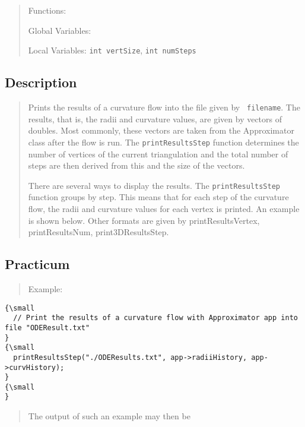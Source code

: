 \begin{quotation}
Functions:

Global Variables:

Local Variables: \texttt{int vertSize}, \texttt{int numSteps}
\end{quotation}

\subsection*{Description}

\begin{quotation}
Prints the results of a curvature flow into the file given by \texttt{%
filename}. The results, that is, the radii and curvature values, are given
by vectors of doubles. Most commonly, these vectors are taken from the
Approximator class after the flow is run. The \texttt{printResultsStep}
function determines the number of vertices of the current triangulation and
the total number of steps are then derived from this and the size of the
vectors.

There are several ways to display the results. The \texttt{printResultsStep}
function groups by step. This means that for each step of the curvature
flow, the radii and curvature values for each vertex is printed. An example
is shown below. Other formats are given by printResultsVertex,
printResultsNum, print3DResultsStep.
\end{quotation}

\subsection*{Practicum}

\begin{quotation}
Example:{\small }
\end{quotation}

\begin{verbatim}
{\small 
  // Print the results of a curvature flow with Approximator app into file "ODEResult.txt"
}
{\small 
  printResultsStep("./ODEResults.txt", app->radiiHistory, app->curvHistory);
}
{\small   
}
\end{verbatim}

\begin{quotation}
The output of such an example may then be{\small }
\end{quotation}

